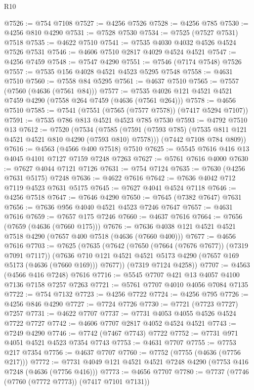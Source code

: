 \begin{lexlean}{R10}
\begin{coremodule}
@7526 := @754 @7108
@7527 := @4256 @7526
@7528 := @4256 @785
@7530 := @4256 @810 @4290
@7531 := @7528 @7530
@7534 := @7525 (@7527 @7531) @7518
@7535 := @4622 @7510
@7541 := @7535 @4030 @4032 @4526 @4524 @7526 @7531
@7546 := @4606 @7510 @2817 @4029 @4524 @4521
@7547 := @4256 @7459
@7548 := @7547 @4290
@7551 := @7546 (@7174 @7548) @7526
@7557 := @7535 @156 @4028 @4521 @4523 @5295 @7548
@7558 := @4631 @7510
@7560 := @7558 @84 @5295
@7561 := @4637 @7510
@7565 := @7557 (@7560 (@4636 (@7561 @84)))
@7577 := @7535 @4026 @121 @4521 @4521 @7459 @4290 (@7558 @264 @7459 (@4636 (@7561 @264)))
@7578 := @4656 @7510
@7585 := @7541 (@7551 (@7565 (@7577 @7578)) (@7417 @5294 @7107))
@7591 := @7535 @786 @813 @4521 @4523 @785 @7530
@7593 := @4792 @7510 @13
@7612 := @7520
    (@7534
      (@7585 (@7591 (@7593 @785) (@7535 @811 @121 @4521 @4521 @810 @4290 (@7593 @810) @7578)))
      (@7442 @7108 @784 @809))
@7616 := @4563 (@4566 @400 @7518) @7510
@7625 := @5545 @7616 @416 @13 @4045 @4101 @7127 @7159 @7248 @7263
@7627 := @5761 @7616 @4000
@7630 := @7627 @4044 @7121 @7126
@7631 := @754 @7124
@7635 := @7630 (@4256 @7631 @5175) @7248
@7636 := @4622 @7616
@7642 := @7636 @4042 @712 @7119 @4523 @7631 @5175
@7645 := @7627 @4041 @4524 @7118
@7646 := @4256 @7518
@7647 := @7646 @4290
@7650 := @7645 (@7382 @7647) @7631
@7656 := @7636 @956 @4040 @4521 @4523 @7246 @7647
@7657 := @4631 @7616
@7659 := @7657 @175 @7246
@7660 := @4637 @7616
@7664 := @7656 (@7659 (@4636 (@7660 @175)))
@7676 := @7636 @4038 @121 @4521 @4521 @7518 @4290 (@7657 @400 @7518 (@4636 (@7660 @400)))
@7677 := @4656 @7616
@7703 := @7625
    (@7635
      (@7642
        (@7650 (@7664 (@7676 @7677)) (@7319 @7091 @7117))
        (@7636 @710 @121 @4521 @4521 @5173 @4290 (@7657 @169 @5173 (@4636 (@7660 @169))) @7677))
      (@7319 @7124 @4258))
@7707 := @4563 (@4566 @416 @7248) @7616
@7716 := @5545 @7707 @421 @13 @4057 @4100 @7136 @7158 @7257 @7263
@7721 := @5761 @7707 @4010 @4056 @7084 @7135
@7722 := @754 @7132
@7723 := @4256 @7722
@7724 := @4256 @795
@7726 := @4256 @846 @4290
@7727 := @7724 @7726
@7730 := @7721 (@7723 @7727) @7257
@7731 := @4622 @7707
@7737 := @7731 @4053 @4055 @4526 @4524 @7722 @7727
@7742 := @4606 @7707 @2817 @4052 @4524 @4521
@7743 := @7249 @4290
@7746 := @7742 (@7467 @7743) @7722
@7752 := @7731 @971 @4051 @4521 @4523 @7354 @7743
@7753 := @4631 @7707
@7755 := @7753 @217 @7354
@7756 := @4637 @7707
@7760 := @7752 (@7755 (@4636 (@7756 @217)))
@7772 := @7731 @4049 @121 @4521 @4521 @7248 @4290 (@7753 @416 @7248 (@4636 (@7756 @416)))
@7773 := @4656 @7707
@7780 := @7737 (@7746 (@7760 (@7772 @7773)) (@7417 @7101 @7131))

\end{coremodule}
\end{lexlean}
